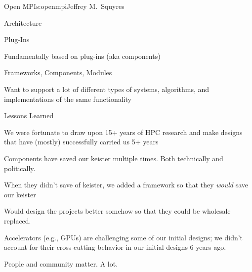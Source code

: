 \begin{aosachapter}{Open MPI}{s:openmpi}{Jeffrey M.\ Squyres}
\begin{aosasect1}{Architecture}
\begin{aosasect2}{Plug-Ins}
\begin{aosaitemize}
\item Fundamentally based on plug-ins (aka components)
  \begin{aosaitemize}
  \item Frameworks, Components, Modules
  \item Want to support a lot of different types of systems,
    algorithms, and implementations of the same functionality
  \end{aosaitemize}

\end{aosaitemize}

\end{aosasect2}

\end{aosasect1}


\begin{aosasect1}{Lessons Learned}

\begin{aosaitemize}
\item We were fortunate to draw upon 15+ years of HPC research and
  make designs that have (mostly) successfully carried us 5+ years
\item Components have saved our keister multiple times.  Both
  technically and politically.
\item When they didn't save of keister, we added a framework so that
  they {\em would} save our keister
\item Would design the projects better somehow so that they could be
  wholesale replaced.
\item Accelerators (e.g., GPUs) are challenging some of our initial
  designs; we didn't account for their cross-cutting behavior in our
  initial designs 6 years ago.
\item People and community matter.  A lot.
\end{aosaitemize}

\end{aosasect1}

\end{aosachapter}
